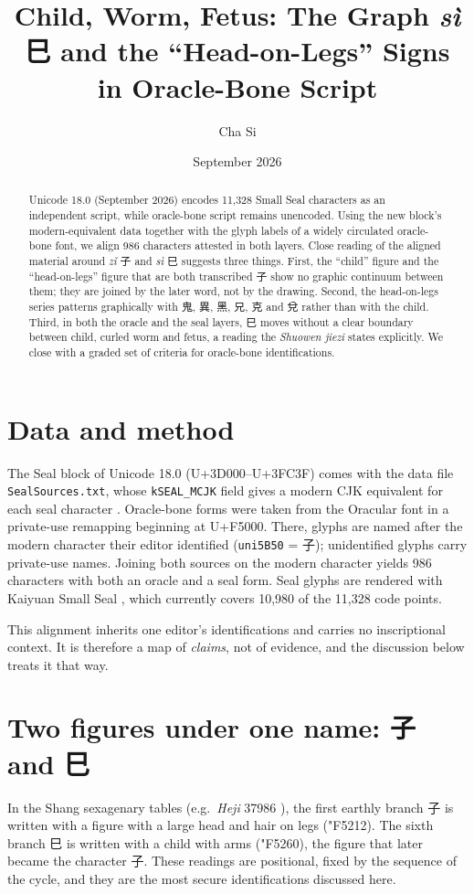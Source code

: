 \documentclass[11pt,a4paper]{article}
\title{Child, Worm, Fetus: The Graph \emph{s\`i} 巳 and the ``Head-on-Legs'' Signs\\in Oracle-Bone Script}
\author{Cha Si}
\date{September 2026}
\newcommand{\og}[1]{{\oraclefont\char"#1}}
\begin{document}
\maketitle

\begin{abstract}
\noindent Unicode 18.0 (September 2026) encodes 11{,}328 Small Seal characters as an independent script, while oracle-bone script remains unencoded. Using the new block's modern-equivalent data together with the glyph labels of a widely circulated oracle-bone font, we align 986 characters attested in both layers. Close reading of the aligned material around \emph{zǐ} 子 and \emph{sì} 巳 suggests three things. First, the ``child'' figure and the ``head-on-legs'' figure that are both transcribed 子 show no graphic continuum between them; they are joined by the later word, not by the drawing. Second, the head-on-legs series patterns graphically with 鬼, 異, 黑, 兄, 克 and 兌 rather than with the child. Third, in both the oracle and the seal layers, 巳 moves without a clear boundary between child, curled worm and fetus, a reading the \emph{Shuowen jiezi} states explicitly. We close with a graded set of criteria for oracle-bone identifications.
\end{abstract}

\section{Data and method}
The Seal block of Unicode 18.0 (U+3D000--U+3FC3F) comes with the data file \texttt{SealSources.txt}, whose \texttt{kSEAL\_MCJK} field gives a modern CJK equivalent for each seal character \cite{ucd18}. Oracle-bone forms were taken from the Oracular font in a private-use remapping beginning at U+F5000. There, glyphs are named after the modern character their editor identified (\texttt{uni5B50} = 子); unidentified glyphs carry private-use names. Joining both sources on the modern character yields 986 characters with both an oracle and a seal form. Seal glyphs are rendered with Kaiyuan Small Seal \cite{kaiyuan}, which currently covers 10{,}980 of the 11{,}328 code points.

This alignment inherits one editor's identifications and carries no inscriptional context. It is therefore a map of \emph{claims}, not of evidence, and the discussion below treats it that way.

\section{Two figures under one name: 子 and 巳}
In the Shang sexagenary tables (e.g.\ \emph{Heji} 37986 \cite{heji}), the first earthly branch 子 is written with a figure with a large head and hair on legs (\og{F5212}). The sixth branch 巳 is written with a child with arms (\og{F5260}), the figure that later became the character 子. These readings are positional, fixed by the sequence of the cycle, and they are the most secure identifications discussed here.
\end{document}
